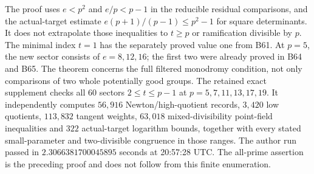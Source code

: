 \begin{remark}
\label{rem:B-RD68-scope}
The proof uses \(e<p^2\) and \(e/p<p-1\) in the reducible
residual comparisons, and the actual-target estimate
\(e(p+1)/(p-1)\le p^2-1\) for square determinants.
It does not extrapolate those inequalities to \(t\ge p\)
or ramification divisible by \(p\).
The minimal index \(t=1\) has the separately proved value one
from B61. At \(p=5\), the new sector consists of \(e=8,12,16\);
the first two were already proved in B64 and B65.
The theorem concerns the full filtered monodromy condition,
not only comparisons of two whole potentially good groups.
The retained exact supplement
checks all \(60\) sectors \(2\le t\le p-1\) at
\(p=5,7,11,13,17,19\). It independently computes
\(56{,}916\) Newton/high-quotient records, \(3{,}420\) low
quotients, \(113{,}832\) tangent weights, \(63{,}018\)
mixed-divisibility point-field inequalities and \(322\)
actual-target logarithm bounds, together with every stated
small-parameter and two-divisible congruence in those ranges.
The author run passed in \(2.3066381700045895\) seconds at
20:57:28 UTC. The all-prime assertion is the preceding proof
and does not follow from this finite enumeration.
\end{remark}
